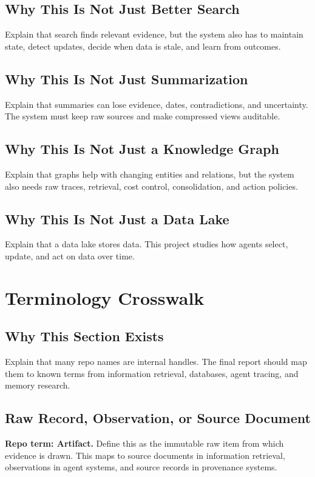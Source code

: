 \documentclass[11pt]{article}
\begin{document}
\subsection{Why This Is Not Just Better Search}
Explain that search finds relevant evidence, but the system also has to maintain state, detect updates, decide when data is stale, and learn from outcomes.

\subsection{Why This Is Not Just Summarization}
Explain that summaries can lose evidence, dates, contradictions, and uncertainty. The system must keep raw sources and make compressed views auditable.

\subsection{Why This Is Not Just a Knowledge Graph}
Explain that graphs help with changing entities and relations, but the system also needs raw traces, retrieval, cost control, consolidation, and action policies.

\subsection{Why This Is Not Just a Data Lake}
Explain that a data lake stores data. This project studies how agents select, update, and act on data over time.

\section{Terminology Crosswalk}

\subsection{Why This Section Exists}
Explain that many repo names are internal handles. The final report should map them to known terms from information retrieval, databases, agent tracing, and memory research.

\subsection{Raw Record, Observation, or Source Document}
\textbf{Repo term: Artifact.} Define this as the immutable raw item from which evidence is drawn. This maps to source documents in information retrieval, observations in agent systems, and source records in provenance systems.
\end{document}
